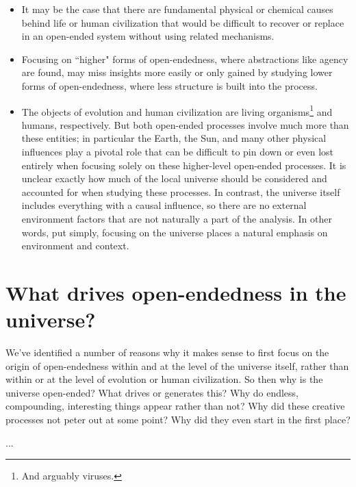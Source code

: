 \documentclass[12pt,letterpaper]{article}
\begin{document}
\begin{itemize}
\item It may be the case that there are fundamental physical or chemical causes behind life or human civilization that would be difficult to recover or replace in an open-ended system without using related mechanisms.
\item Focusing on ``higher" forms of open-endedness, where abstractions like agency are found, may miss insights more easily or only gained by studying lower forms of open-endedness, where less structure is built into the process.
\item The objects of evolution and human civilization are living organisms\footnote{And arguably viruses.} and humans, respectively. But both open-ended processes involve much more than these entities; in particular the Earth, the Sun, and many other physical influences play a pivotal role that can be difficult to pin down or even lost entirely when focusing solely on these higher-level open-ended processes. It is unclear exactly how much of the local universe should be considered and accounted for when studying these processes. In contrast, the universe itself includes everything with a causal influence, so there are no external environment factors that are not naturally a part of the analysis. In other words, put simply, focusing on the universe places a natural emphasis on environment and context.
\end{itemize}

\section{What drives open-endedness in the universe?}


We've identified a number of reasons why it makes sense to first focus on the origin of open-endedness within and at the level of the universe itself, rather than within or at the level of evolution or human civilization. So then why is the universe open-ended? What drives or generates this? Why do endless, compounding, interesting things appear rather than not? Why did these creative processes not peter out at some point? Why did they even start in the first place?

...

\end{document}
